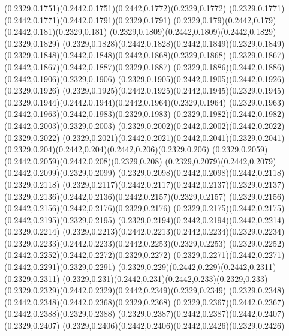 (0.2329,0.1751)(0.2442,0.1751)(0.2442,0.1772)(0.2329,0.1772)
(0.2329,0.1771)(0.2442,0.1771)(0.2442,0.1791)(0.2329,0.1791)
(0.2329,0.179)(0.2442,0.179)(0.2442,0.181)(0.2329,0.181)
(0.2329,0.1809)(0.2442,0.1809)(0.2442,0.1829)(0.2329,0.1829)
(0.2329,0.1828)(0.2442,0.1828)(0.2442,0.1849)(0.2329,0.1849)
(0.2329,0.1848)(0.2442,0.1848)(0.2442,0.1868)(0.2329,0.1868)
(0.2329,0.1867)(0.2442,0.1867)(0.2442,0.1887)(0.2329,0.1887)
(0.2329,0.1886)(0.2442,0.1886)(0.2442,0.1906)(0.2329,0.1906)
(0.2329,0.1905)(0.2442,0.1905)(0.2442,0.1926)(0.2329,0.1926)
(0.2329,0.1925)(0.2442,0.1925)(0.2442,0.1945)(0.2329,0.1945)
(0.2329,0.1944)(0.2442,0.1944)(0.2442,0.1964)(0.2329,0.1964)
(0.2329,0.1963)(0.2442,0.1963)(0.2442,0.1983)(0.2329,0.1983)
(0.2329,0.1982)(0.2442,0.1982)(0.2442,0.2003)(0.2329,0.2003)
(0.2329,0.2002)(0.2442,0.2002)(0.2442,0.2022)(0.2329,0.2022)
(0.2329,0.2021)(0.2442,0.2021)(0.2442,0.2041)(0.2329,0.2041)
(0.2329,0.204)(0.2442,0.204)(0.2442,0.206)(0.2329,0.206)
(0.2329,0.2059)(0.2442,0.2059)(0.2442,0.208)(0.2329,0.208)
(0.2329,0.2079)(0.2442,0.2079)(0.2442,0.2099)(0.2329,0.2099)
(0.2329,0.2098)(0.2442,0.2098)(0.2442,0.2118)(0.2329,0.2118)
(0.2329,0.2117)(0.2442,0.2117)(0.2442,0.2137)(0.2329,0.2137)
(0.2329,0.2136)(0.2442,0.2136)(0.2442,0.2157)(0.2329,0.2157)
(0.2329,0.2156)(0.2442,0.2156)(0.2442,0.2176)(0.2329,0.2176)
(0.2329,0.2175)(0.2442,0.2175)(0.2442,0.2195)(0.2329,0.2195)
(0.2329,0.2194)(0.2442,0.2194)(0.2442,0.2214)(0.2329,0.2214)
(0.2329,0.2213)(0.2442,0.2213)(0.2442,0.2234)(0.2329,0.2234)
(0.2329,0.2233)(0.2442,0.2233)(0.2442,0.2253)(0.2329,0.2253)
(0.2329,0.2252)(0.2442,0.2252)(0.2442,0.2272)(0.2329,0.2272)
(0.2329,0.2271)(0.2442,0.2271)(0.2442,0.2291)(0.2329,0.2291)
(0.2329,0.229)(0.2442,0.229)(0.2442,0.2311)(0.2329,0.2311)
(0.2329,0.231)(0.2442,0.231)(0.2442,0.233)(0.2329,0.233)
(0.2329,0.2329)(0.2442,0.2329)(0.2442,0.2349)(0.2329,0.2349)
(0.2329,0.2348)(0.2442,0.2348)(0.2442,0.2368)(0.2329,0.2368)
(0.2329,0.2367)(0.2442,0.2367)(0.2442,0.2388)(0.2329,0.2388)
(0.2329,0.2387)(0.2442,0.2387)(0.2442,0.2407)(0.2329,0.2407)
(0.2329,0.2406)(0.2442,0.2406)(0.2442,0.2426)(0.2329,0.2426)
